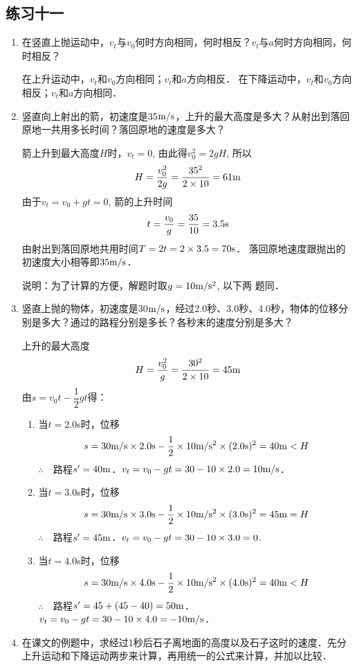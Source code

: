 \subsection{练习十一}

\begin{enumerate}
	\item 在竖直上抛运动中，$v_t$与$v_0$何时方向相同，何时相反？$v_t$与$a$何时方向相同，何时相反？

    \begin{solution}
        在上升运动中，$v_t$和$v_0$方向相同；$v_t$和$a$方向相反．
        在下降运动中，$v_t$和$v_0$方向相反；$v_t$和$a$方向相同． 
    \end{solution}
\item 竖直向上射出的箭，初速度是35$\text{m}/\text{s}$，上升的最大高度是多大？从射出到落回原地一共用多长时间？落回原地的速度是多大？

\begin{solution}
箭上升到最大高度$H$时，$v_t=0$, 由此得$v^2_0=2gH$,
所以
\[H=\frac{v^2_0}{2g}=\frac{35^2}{2\times 10}=61{\rm m}\]
由于$v_t=v_0+gt=0$, 箭的上升时间
\[t=\frac{v_0}{g}=\frac{35}{10}=3.5{\rm s}\]
由射出到落回原地共用时间$T=2t=2\times3.5=70{\rm s}$．
落回原地速度跟抛出的初速度大小相等即$35\text{m}/\text{s}$．

说明：为了计算的方便，解题时取$g=10\text{m}/\text{s}^2$, 以下两
题同．
\end{solution}
\item 竖直上抛的物体，初速度是30$\text{m}/\text{s}$，经过2.0秒、3.0秒、4.0秒，物体的位移分别是多大？通过的路程分别是多长？各秒末的速度分别是多大？

\begin{solution}
上升的最大高度
\[H=\frac{v^2_0}{g}=\frac{30^2}{2\times 10}=45{\rm m}\]
由$s=v_0t-\dfrac{1}{2}gt$得：
\begin{enumerate}
    \item 当$t=2.0$s时，位移
    \[s=30\text{m}/\text{s} \times2.0{\rm s}-\frac{1}{2}\times 10\text{m}/\text{s}^2\times(2.0{\rm s})^2=40{\rm m}<H\]
    $\therefore\quad $路程$s'=40{\rm m}$．$v_t=v_0-gt=30-10\times2.0=10\text{m}/\text{s}$．
\item 当$t=3.0$s时，位移$$s=30\text{m}/\text{s}\times3.0{\rm s}-\frac{1}{2}
\times10\text{m}/\text{s}^2\times(3.0{\rm s})^2=45{\rm m}=H$$
$\therefore\quad $路程$s'=45{\rm m}$．$v_t=v_0-gt=30-10\times3.0=0$.
\item 当$t=4.0$s时，位移$$s=30\text{m}/\text{s}\times4.0{\rm s}-\frac{1}{2}
\times10\text{m}/\text{s}^2\times(4.0{\rm s})^2=40{\rm m}<H$$
$\therefore\quad $路程$s'=45+(45-40)=50{\rm m}$．
$v_t=v_0-gt=30-10\times4.0=-10\text{m}/\text{s}$．
\end{enumerate}

\end{solution}
\item 在课文的例题中，求经过1秒后石子离地面的高度以及石子这时的速度．先分上升运动和下降运动两步来计算，再用统一的公式来计算，并加以比较．


\end{enumerate}
